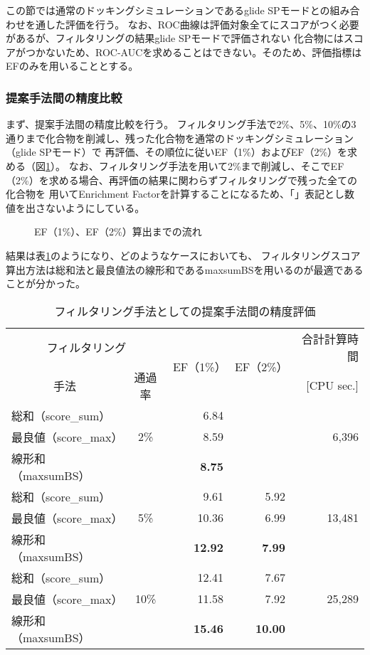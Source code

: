 この節では通常のドッキングシミュレーションであるglide SPモードとの組み合わせを通した評価を行う。
なお、ROC曲線は評価対象全てにスコアがつく必要があるが、フィルタリングの結果glide SPモードで評価されない
化合物にはスコアがつかないため、ROC-AUCを求めることはできない。そのため、評価指標はEFのみを用いることとする。

\subsubsection{提案手法間の精度比較}\label{subsubsec:filtering_proposal}
まず、提案手法間の精度比較を行う。
フィルタリング手法で2\%、5\%、10\%の3通りまで化合物を削減し、残った化合物を通常のドッキングシミュレーション（glide SPモード）で
再評価、その順位に従いEF（1\%）およびEF（2\%）を求める（図\ref{fig:filtering_image}）。
なお、フィルタリング手法を用いて2\%まで削減し、そこでEF（2\%）を求める場合、再評価の結果に関わらずフィルタリングで残った全ての化合物を
用いてEnrichment Factorを計算することになるため、「\textendash」表記とし数値を出さないようにしている。

\begin{figure}[htp]
 \begin{center}
  \caption{EF（1\%）、EF（2\%）算出までの流れ}
  \label{fig:filtering_image}
 \end{center}
\end{figure}

結果は表\ref{table:filtering_proposal}のようになり、どのようなケースにおいても、
フィルタリングスコア算出方法は総和法と最良値法の線形和であるmaxsumBSを用いるのが最適であることが分かった。

\begin{table}[htb] \centering
	\caption{フィルタリング手法としての提案手法間の精度評価}
	\label{table:filtering_proposal}
	\begin{tabular}{lc|rr|r}
	\hline
	\multicolumn{2}{c|}{フィルタリング}	&\multirow{2}{*}{EF（1\%）}	&\multirow{2}{*}{EF（2\%）}	&合計計算時間	\\
	\multicolumn{1}{c}{手法}	&通過率	&						&						&[CPU sec.]		\\ \hline
	総和（score\_sum）		&		&6.84					&\textendash				&				\\
	最良値（score\_max）	&2\%	&8.59					&\textendash				&6,396			\\
	線形和（maxsumBS）	&		&\textbf{8.75}				&\textendash				&				\\ \hline
	総和（score\_sum）		&		&9.61					&5.92					&				\\
	最良値（score\_max）	&5\%	&10.36					&6.99					&13,481			\\
	線形和（maxsumBS）	&		&\textbf{12.92}			&\textbf{7.99}				&				\\ \hline
	総和（score\_sum）		&		&12.41					&7.67					&				\\
	最良値（score\_max）	&10\%	&11.58					&7.92					&25,289			\\
	線形和（maxsumBS）	&		&\textbf{15.46}			&\textbf{10.00}			&				\\ \hline
	\end{tabular}
\end{table}


